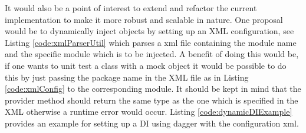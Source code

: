    It would also be a point of interest to extend and refactor the
    current implementation to make it more robust and scalable in nature.
    One proposal would be to dynamically inject objects by setting up an 
    XML configuration, see Listing \ref{code:xmlParserUtil}  which
    parses a xml file containing the module name and the specific module
    which is to be injected. A benefit of doing this would be, if one wants
    to unit test a class with a mock object it would be possible to do this
    by just passing the package name in the XML file as in 
    Listing \ref{code:xmlConfig} to the 
    corresponding module. It should be kept in mind that the provider
    method should return the same type as the one which is specified
    in the XML otherwise a runtime error would occur. 
    Listing \ref{code:dynamicDIExample} provides an example for setting up 
    a DI using dagger with the configuration xml.  

    
    
        